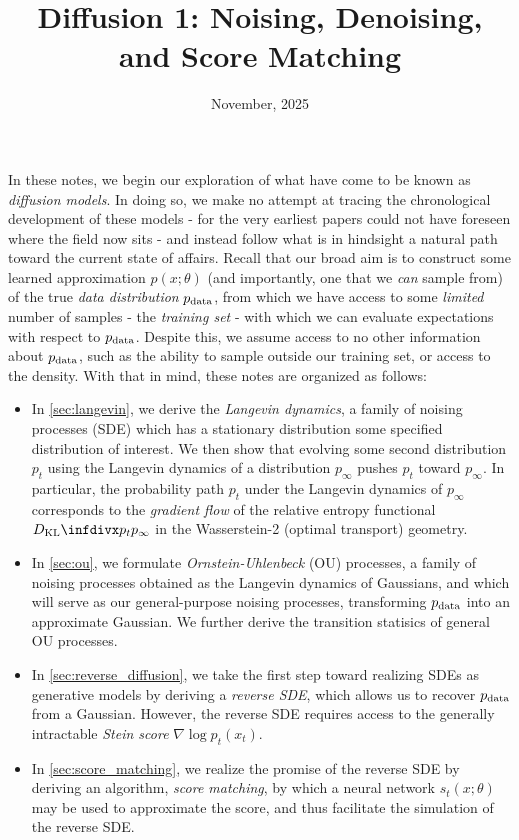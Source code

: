 \documentclass{scrartcl}
\title{Diffusion 1: Noising, Denoising, and Score Matching}
\date{November, 2025}
\begin{document}
\maketitle
In these notes, we begin our exploration of what have come to be known as \textit{diffusion models}. In doing so, we make no attempt at tracing the chronological development of these models - for the very earliest papers could not have foreseen where the field now sits - and instead follow what is in hindsight a natural path toward the current state of affairs. 
Recall that our broad aim is to construct some learned approximation $p(x;\theta)$ (and importantly, one that we \textit{can} sample from) of the true \textit{data distribution} $p_{\text{data}}$, from which we have access to some \textit{limited} number of samples - the \textit{training set} - with which we can evaluate expectations with respect to $p_{\text{data}}$. Despite this, we assume access to no other information about $p_{\text{data}}$, such as the ability to sample outside our training set, or access to the density.
With that in mind, these notes are organized as follows:
\begin{itemize}
    \item In \cref{sec:langevin}, we derive the \textit{Langevin dynamics}, a family of noising processes (SDE) which has a stationary distribution some specified distribution of interest. We then show that evolving some second distribution $p_t$ using the Langevin dynamics of a distribution $p_\infty$ pushes $p_t$ toward $p_\infty$. In particular, the probability path $p_t$ under the Langevin dynamics of $p_\infty$ corresponds to the \textit{gradient flow} of the relative entropy functional $\dkl{p_t}{p_\infty}$ in the Wasserstein-2 (optimal transport) geometry.
    \item In \cref{sec:ou}, we formulate \textit{Ornstein-Uhlenbeck} (OU) processes, a family of noising processes obtained as the Langevin dynamics of Gaussians, and which will serve as our general-purpose noising processes, transforming $p_{\text{data}}$ into an approximate Gaussian. We further derive the transition statisics of general OU processes. 
    \item In \cref{sec:reverse_diffusion}, we take the first step toward realizing SDEs as generative models by deriving a \textit{reverse SDE}, which allows us to recover $p_{\text{data}}$ from a Gaussian. However, the reverse SDE requires access to the generally intractable \textit{Stein score} $\nabla \log p_t(x_t)$.
    \item In \cref{sec:score_matching}, we realize the promise of the reverse SDE by deriving an algorithm, \textit{score matching}, by which a neural network $s_t(x;\theta)$ may be used to approximate the score, and thus facilitate the simulation of the reverse SDE.
\end{itemize}
\end{document}
